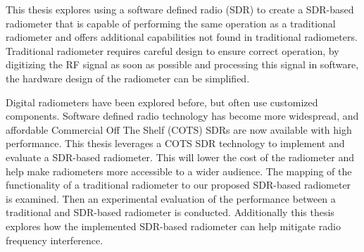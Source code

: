 
This thesis explores using a software defined radio (SDR) to create a SDR-based radiometer that is capable of performing the same operation as a traditional radiometer and offers additional capabilities not found in traditional radiometers.  Traditional radiometer requires careful design to ensure correct operation, by digitizing the RF signal as soon as possible and processing this signal in software, the hardware design of the radiometer can be simplified.

Digital radiometers have been explored before, but often use customized components.  Software defined radio technology has become more widespread, and affordable Commercial Off The Shelf (COTS) SDRs are now available with high performance.  This thesis leverages  a COTS SDR technology to implement and evaluate a SDR-based radiometer.  This will lower the cost of the radiometer and help make radiometers more accessible to a wider audience.  The mapping of the functionality of a traditional radiometer to our proposed SDR-based radiometer is examined.  Then an experimental evaluation of the performance between a traditional and SDR-based radiometer is conducted.  Additionally this thesis explores how the implemented SDR-based radiometer can help mitigate radio frequency interference.


